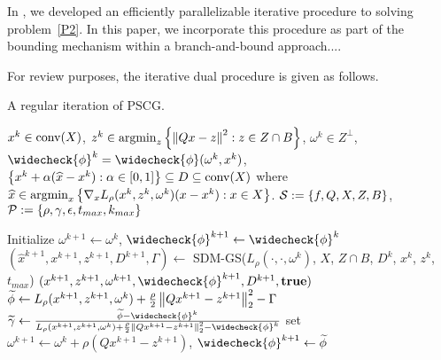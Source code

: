 In \cite{previouspaper}, we developed an efficiently parallelizable iterative procedure to solving problem~\eqref{P2}. 
In this paper, we incorporate this procedure as part of the bounding mechanism within a branch-and-bound approach....

For review purposes, the iterative dual procedure is given as follows.

\begin{algorithm}[H]
\caption{A regular iteration of PSCG.\label{AlgDualAscentGSSSC}}
\begin{algorithmic}
\State \quad\quad$x^k \in \operatorname{conv}(X)$, $z^k \in \operatorname*{argmin}_z \left\{ \left \| Qx-z \right \|^2: z \in Z \cap B \right \}$, $\omega^k \in Z^\perp$, 
\State \quad\quad$\widecheck{\phi}^k = \widecheck{\phi}(\omega^k,x^k)$, $\left\{ x^k + \alpha (\widehat{x} - x^k) : \alpha \in [0,1] \right \} \subseteq {D} \subseteq \operatorname{conv}(X)$ where
\State \quad\quad\quad\quad$\widehat{x} \in \operatorname*{argmin}_x \left\{ \nabla_x L_\rho(x^k,z^k,\omega^k) (x - {x}^k) : x \in X \right \}$.
\State \quad\quad$\mathcal{S}:=\left\{ f,Q,X,Z,B \right \}$, $\mathcal{P}:=\left\{ \rho,\gamma, \epsilon, t_{max}, k_{max} \right \}$
\end{algorithmic}
\begin{algorithmic}[1]
       \State Initialize $\omega^{k+1} \gets \omega^{k}$, $\widecheck{\phi}^{k+1} \gets \widecheck{\phi}^{k}$ 
       \State $(\widehat{x}^{k+1},x^{k+1},z^{k+1},D^{k+1},\Gamma) \gets$ SDM-GS($L_\rho(\cdot,\cdot,\omega^k)$, $X$, $Z \cap B$, $D^k$, $x^{k}$, $z^{k}$, $t_{max}$) \label{ReturnSDMGS}
        \label{Alg4BeginTermCond}
       	 $(x^{k+1},z^{k+1},\omega^{k+1},\widecheck{\phi}^{k+1}, D^{k+1}, \textbf{true})$
       \EndIf \label{Alg4EndTermCond}
       \State $\widetilde{\phi} \gets  L_{\rho}({x}^{k+1},{z} ^{k+1},\omega^k) + \frac{\rho}{2} \left \| Q{x}^{k+1}-{z}^{k+1} \right \|_2^2 - \Gamma$ \label{ComputePhiTilde}
       \State $\widetilde{\gamma} \gets \frac{\widetilde{\phi} - \widecheck{\phi}^k}{L_\rho({x}^{k+1},{z}^{k+1}, \omega^k) + \frac{\rho}{2} \norm{Q{x}^{k+1}-{z} ^{k+1}}_2^2-\widecheck{\phi}^k}$ \label{ComputeCritVal}
       \If{$\widetilde{\gamma} \ge \gamma$} \label{Alg4LineSSC}
         \State set $\omega^{k+1} \gets \omega^{k} + \rho (Q{x}^{k+1}-{z}^{k+1})$, $\widecheck{\phi}^{k+1} \gets \widetilde{\phi}$

\end{algorithmic}
\end{algorithm}
